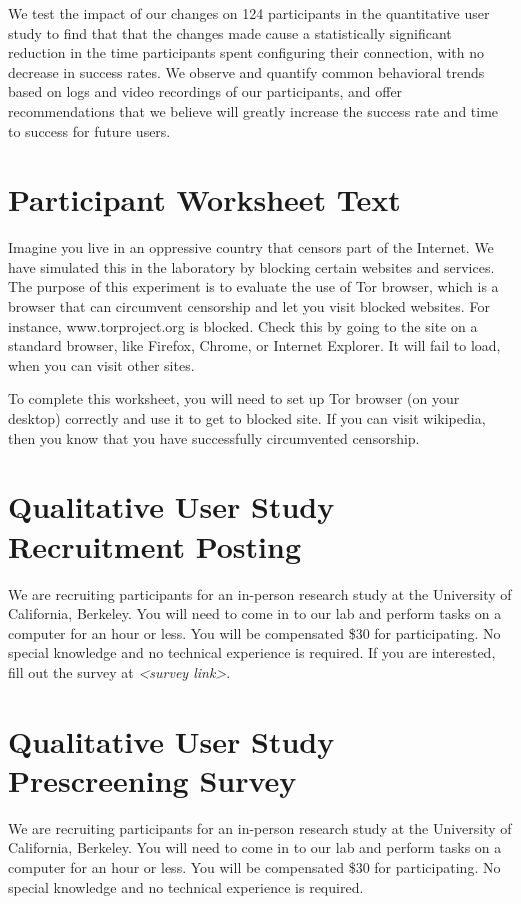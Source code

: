 \documentclass[USenglish,oneside,twocolumn]{article}
\begin{document}
We test the impact of our changes on 124 participants in the quantitative user study to find that that the changes made cause a statistically significant reduction in the time participants spent configuring their connection, with no decrease in success rates. We observe and quantify common behavioral trends based on logs and video recordings of our participants, and offer recommendations that we believe will greatly increase the success rate and time to success for future users. 




\appendix
\section{Participant Worksheet Text} 
\label{participant-worksheet}
Imagine you live in an oppressive country that censors part of the Internet. We have simulated this in the laboratory by blocking certain websites and services. The purpose of this experiment is to evaluate the use of Tor browser, which is a browser that can circumvent censorship and let you visit blocked websites. For instance, www.torproject.org is blocked. Check this by going to the site on a standard browser, like Firefox, Chrome, or Internet Explorer. It will fail to load, when you can visit other sites.

To complete this worksheet, you will need to set up Tor browser (on your desktop) correctly and use it to get to blocked site. If you can visit wikipedia, then you know that you have successfully circumvented censorship.

\section{Qualitative User Study Recruitment Posting} 
\label{qualitative-recruitment}
We are recruiting participants for an in-person research study at the University of California, Berkeley. You will need to come in to our lab and perform tasks on a computer for an hour or less. You will be compensated \$30 for participating. 
No special knowledge and no technical experience is required. If you are interested, fill out the survey at \textit{<survey link>}. 

\section{Qualitative User Study Prescreening Survey} 
\label{qualitative-prescreening}
We are recruiting participants for an in-person research study at the University of California, Berkeley. You will need to come in to our lab and perform tasks on a computer for an hour or less. You will be compensated \$30 for participating. No special knowledge and no technical experience is required.\\
\end{document}
